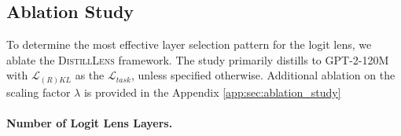 \documentclass{article}
\theoremstyle{plain}
\theoremstyle{definition}
\theoremstyle{remark}
\begin{document}




\subsection{Ablation Study}
To determine the most effective layer selection pattern for the logit lens, we ablate the \textsc{DistillLens} framework. 
The study primarily distills to  GPT-2-120M with $\mathcal{L}_{(R)KL}$ as the $\mathcal{L}_{task}$, unless specified otherwise.
Additional ablation on the scaling factor $\lambda$ is provided in the Appendix \cref{app:sec:ablation_study}

\paragraph{Number of Logit Lens Layers.}

\begin{table}[t]
    \centering
    \caption{\textbf{Number of intermediate layers for \textsc{DistillLens} optimization.} ``0'' intermediate layers means a baseline with no intermediate layers matching. \textsc{DistillLens} peaks at 5 layers.}
    \label{tab:logit_lens_layers}
\end{table}
\end{document}

